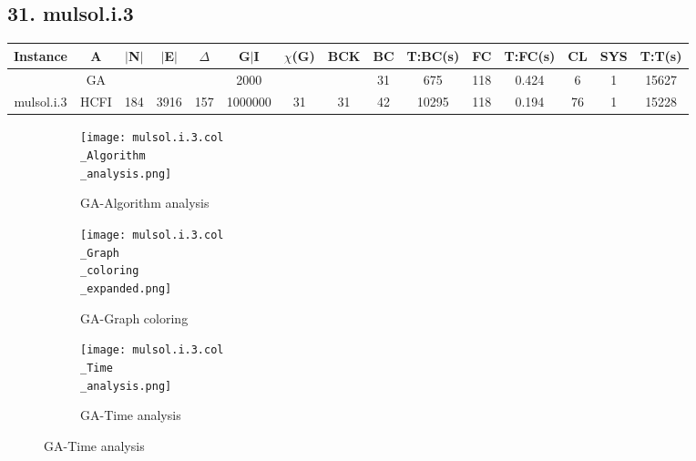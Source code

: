 \documentclass[10pt]{article}
\begin{document}
\subsection*{\hspace{0,9073976cm} 31. mulsol.i.3}
\begin{table}[H]
\centering
\begin{tabular}{|c|c|c|c|c|c|c|c|c|c|c|c|c|c|c|}
\hline
Instance& A &$|$N$|$ & $|$E$|$ & $\Delta$ & G$|$I & $\chi$(G) &BCK&BC & T:BC(s) & FC & T:FC(s) & CL & SYS & T:T(s) \\ \hline \hline

	&GA&       &                   &                     &    2000     &     \cellcolor{yellow} & {\cellcolor{yellow}}& {{\cellcolor{green}31}}
&675   &118        &0.424                   &6                    &1          &15627        \\ \cline{2-2} \cline{6-6} \cline{9-15}
 \multirow{-2}{*}{mulsol.i.3} &HCFI   &\multirow{-2}{*}{184}   &\multirow{-2}{*}{3916}     &\multirow{-2}{*}{157}     &1000000     &\multirow{-2}{*}{\cellcolor{yellow}31}      & \multirow{-2}{*}{\cellcolor{yellow}31}    &{\cellcolor{green}42}     &10295         &118    &0.194         &76    &1     &15228        \\ \hline 
\end{tabular}
\end{table}
\graphicspath{{./Core1/Solutions/GA/mulsol.i.3.col}}
\begin{figure}[H]
\begin{subfigure}{.33\textwidth}
  \centering
  \texttt{[image: mulsol.i.3.col\\\_Algorithm\\\_analysis.png]}
  \caption{GA-Algorithm analysis}
   \label{fig:subfig1}
\end{subfigure}%
\begin{subfigure}{.33\textwidth}
  \centering
  \texttt{[image: mulsol.i.3.col\\\_Graph\\\_coloring\\\_expanded.png]}
  \caption{GA-Graph coloring}
  \label{fig:subfig2}
\end{subfigure}
\begin{subfigure}{.33\textwidth}
  \centering
  \texttt{[image: mulsol.i.3.col\\\_Time\\\_analysis.png]}
  \caption{GA-Time analysis}
  \end{subfigure}
\end{figure}
\end{document}
